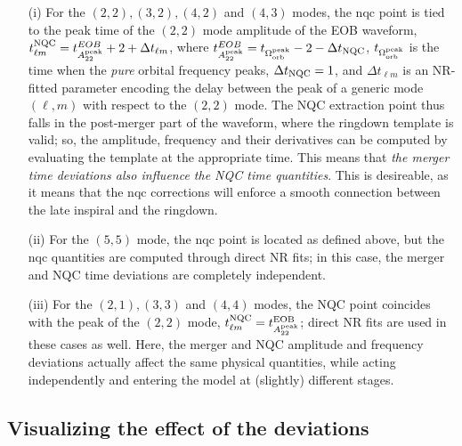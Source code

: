 \documentclass[prd,amssymb,amsmath,amsfonts,nofootinbib,reprint,showpacs,longbibliography]{revtex4-1}
\begin{document}
\begin{itemize}

\item[(i)] For the $(2,2), (3,2), (4,2)$ and $(4,3)$ modes, the \ac{nqc} point is tied to the peak time of the $(2,2)$
mode amplitude of the EOB waveform, $t_{\ell m}^{\rm NQC} = t_{A_{22}^{\rm peak}}^{EOB} + 2 + \Delta t_{\ell m}$, 
where $t_{A_{22}^{\rm peak}}^{EOB} = t_{\Omega_{\rm orb}^{\rm peak}} - 2 - \Delta t_{\rm NQC}$, $t_{\Omega_{\rm orb}^{\rm peak}}$
is the time when the \textit{pure} orbital frequency peaks, $\Delta t_{\rm NQC} = 1$, and $\Delta t_{\ell m}$ is an NR-fitted parameter
encoding the delay between the peak of a generic mode $(\ell, m)$ with respect to the $(2,2)$ mode.
The NQC extraction point thus falls in the post-merger part of the waveform, where the ringdown
template is valid; so, the amplitude, frequency and their derivatives can be computed by evaluating the
template at the appropriate time. This means that \textit{the merger time deviations also influence the NQC time
quantities}. This is desireable, as it means that the \ac{nqc} corrections will enforce a smooth connection between
the late inspiral and the ringdown.
\item[(ii)] For the $(5,5)$ mode, the \ac{nqc} point is located as defined above, but the \ac{nqc} quantities
are computed through direct NR fits; in this case, the merger and NQC time deviations are completely independent.
\item[(iii)] For the $(2,1), (3,3)$ and $(4,4)$ modes, the NQC point coincides
with the peak of the $(2,2)$ mode, $t_{\ell m}^{\rm NQC} = t_{A_{22}^{\rm peak}}^{\rm EOB}$; direct NR fits 
are used in these cases as well. Here, the merger and NQC amplitude and frequency deviations actually affect
the same physical quantities, while acting independently and entering the model at (slightly) different stages.
\end{itemize}

\subsection{Visualizing the effect of the deviations}
\end{document}
